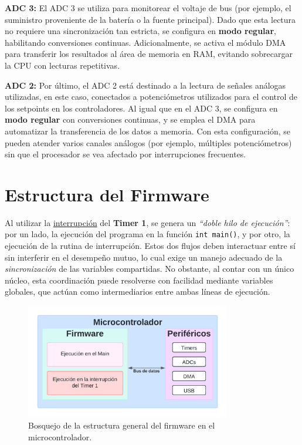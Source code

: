 \documentclass[11pt]{report}
\begin{document}
\textbf{ADC 3:} El ADC 3 se utiliza para monitorear el voltaje de bus (por ejemplo, el suministro proveniente de la batería o la fuente principal). Dado que esta lectura no requiere una sincronización tan estricta, se configura en \textbf{modo regular}, habilitando conversiones continuas. Adicionalmente, se activa el módulo DMA para transferir los resultados al área de memoria en RAM, evitando sobrecargar la CPU con lecturas repetitivas.

\textbf{ADC 2:} Por último, el ADC 2 está destinado a la lectura de señales análogas utilizadas, en este caso, conectados a potenciómetros utilizados para el control de los setpoints en los controladores. Al igual que en el ADC 3, se configura en \textbf{modo regular} con conversiones continuas, y se emplea el DMA para automatizar la transferencia de los datos a memoria. Con esta configuración, se pueden atender varios canales análogos (por ejemplo, múltiples potenciómetros) sin que el procesador se vea afectado por interrupciones frecuentes.

\section{Estructura del Firmware}

Al utilizar la \href{https://www.youtube.com/watch?v=poa_QBvtIBA}{interrupción} del \textbf{Timer 1}, se genera un \emph{“doble hilo de ejecución”}: por un lado, la ejecución del programa en la función \texttt{int main()}, y por otro, la ejecución de la rutina de interrupción. Estos dos flujos deben interactuar entre sí sin interferir en el desempeño mutuo, lo cual exige un manejo adecuado de la \emph{sincronización} de las variables compartidas. No obstante, al contar con un único núcleo, esta coordinación puede resolverse con facilidad mediante variables globales, que actúan como intermediarios entre ambas líneas de ejecución.

\begin{figure}[ht]
	\centering
	\includegraphics[width=0.8\textwidth]{imagenes/Diagramas/lineas de ejecucion.png}
	\caption{Bosquejo de la estructura general del firmware en el microcontrolador.}
	\label{firmware_microcontrolador}
\end{figure}
\FloatBarrier
\end{document}

